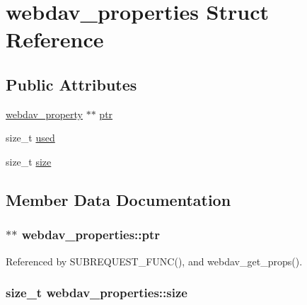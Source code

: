 \hypertarget{structwebdav__properties}{\section{webdav\-\_\-properties Struct Reference}
\label{structwebdav__properties}
}
\subsection*{Public Attributes}
\begin{DoxyCompactItemize}
\item 
\hyperlink{structwebdav__property}{webdav\-\_\-property} $\ast$$\ast$ \hyperlink{structwebdav__properties_a7cb1b33f712bd251023549cfc7194407}{ptr}
\item 
size\-\_\-t \hyperlink{structwebdav__properties_ad6a8788a6be3d4755ab36451e845209b}{used}
\item 
size\-\_\-t \hyperlink{structwebdav__properties_adab4654310034f4b96fce2e16d3c26e5}{size}
\end{DoxyCompactItemize}


\subsection{Member Data Documentation}
\hypertarget{structwebdav__properties_a7cb1b33f712bd251023549cfc7194407}{
\subsubsection[{ptr}]{$\ast$$\ast$ webdav\-\_\-properties\-::ptr}}\label{structwebdav__properties_a7cb1b33f712bd251023549cfc7194407}


Referenced by S\-U\-B\-R\-E\-Q\-U\-E\-S\-T\-\_\-\-F\-U\-N\-C(), and webdav\-\_\-get\-\_\-props().

\hypertarget{structwebdav__properties_adab4654310034f4b96fce2e16d3c26e5}{
\subsubsection[{size}]{\setlength{\rightskip}{0pt plus 5cm}size\-\_\-t webdav\-\_\-properties\-::size}}\label{structwebdav__properties_adab4654310034f4b96fce2e16d3c26e5}


